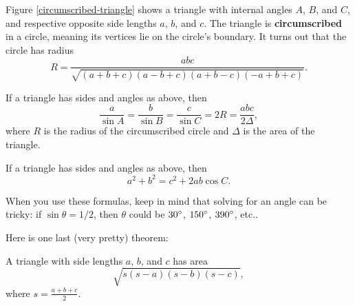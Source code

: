 Figure \ref{circumscribed-triangle} shows a triangle with internal angles $A$, $B$, and $C$, and respective opposite side lengths $a$, $b$, and $c$. The triangle is \textbf{circumscribed} in a circle, meaning its vertices lie on the circle's boundary. It turns out that the circle has radius
$$R=\frac{abc}{\sqrt{(a+b+c)(a-b+c)(a+b-c)(-a+b+c)}}.$$



\begin{thm}
If a triangle has sides and angles as above, then
$$\frac{a}{\sin A}=\frac{b}{\sin B}=\frac{c}{\sin C}=2R=\frac{abc}{2\Delta},$$
where $R$ is the radius of the circumscribed circle and $\Delta$ is the area of the triangle.
\end{thm}

\begin{thm}
If a triangle has sides and angles as above, then
$$a^2+b^2=c^2+2ab\cos C.$$
\end{thm}

When you use these formulas, keep in mind that solving for an angle can be tricky: if $\sin\theta=1/2$, then $\theta$ could be $30\degree$, $150\degree$, $390\degree$, etc..

Here is one last (very pretty) theorem:
\begin{thm}
A triangle with side lengths $a$, $b$, and $c$ has area
$$\sqrt{s(s-a)(s-b)(s-c)},$$
where $s=\frac{a+b+c}{2}$.
\end{thm}
